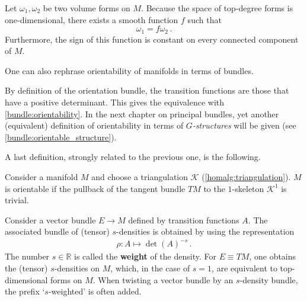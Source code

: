     \begin{property}
        Let $\omega_1,\omega_2$ be two volume forms on $M$. Because the space of top-degree forms is one-dimensional, there exists a smooth function $f$ such that \[\omega_1 = f\omega_2\,.\] Furthermore, the sign of this function is constant on every connected component of $M$.
    \end{property}

    One can also rephrase orientability of manifolds in terms of bundles.

    \begin{remark}
        By definition of the orientation bundle, the transition functions are those that have a positive determinant. This gives the equivalence with \cref{bundle:orientability}. In the next chapter on principal bundles, yet another (equivalent) definition of orientability in terms of \textit{$G$-structures} will be given (see \cref{bundle:orientable_structure}).
    \end{remark}

    A last definition, strongly related to the previous one, is the following.
    \begin{adefinition}\label{bundle:orientable_skeleton}
        Consider a manifold $M$ and choose a triangulation $\mathcal{K}$ (\cref{homalg:triangulation}). $M$ is orientable if the pullback of the tangent bundle $TM$ to the $1$-skeleton $\mathcal{K}^1$ is trivial.
    \end{adefinition}

    \begin{definition}\label{bundle:density}
        Consider a vector bundle $E\rightarrow M$ defined by transition functions $A$. The associated bundle of (tensor) $s$-densities is obtained by using the representation
        \begin{gather}
            \rho:A\mapsto\det(A)^{-s}\,.
        \end{gather}
        The number $s\in\mathbb{R}$ is called the \textbf{weight} of the density. For $E\equiv TM$, one obtains the (tensor) $s$-densities on $M$, which, in the case of $s=1$, are equivalent to top-dimensional forms on $M$. When twisting a vector bundle by an $s$-density bundle, the prefix `$s$-weighted' is often added.
    \end{definition}

